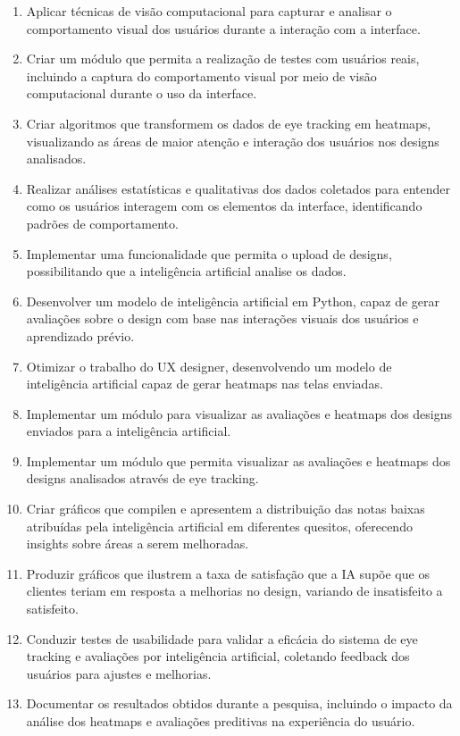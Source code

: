 \begin{enumerate}
    \item Aplicar técnicas de visão computacional para capturar e analisar o comportamento visual dos usuários durante a interação com a interface.
    \item Criar um módulo que permita a realização de testes com usuários reais, incluindo a captura do comportamento visual por meio de visão computacional durante o uso da interface.
    \item Criar algoritmos que transformem os dados de eye tracking em heatmaps, visualizando as áreas de maior atenção e interação dos usuários nos designs analisados.
    \item Realizar análises estatísticas e qualitativas dos dados coletados para entender como os usuários interagem com os elementos da interface, identificando padrões de comportamento.
    \item Implementar uma funcionalidade que permita o upload de designs, possibilitando que a inteligência artificial analise os dados.
    \item Desenvolver um modelo de inteligência artificial em Python, capaz de gerar avaliações sobre o design com base nas interações visuais dos usuários e aprendizado prévio.
    \item Otimizar o trabalho do UX designer, desenvolvendo um modelo de inteligência artificial capaz de gerar heatmaps nas telas enviadas.
    \item Implementar um módulo para visualizar as avaliações e heatmaps dos designs enviados para a inteligência artificial.
    \item Implementar um módulo que permita visualizar as avaliações e heatmaps dos designs analisados através de eye tracking.
    \item Criar gráficos que compilen e apresentem a distribuição das notas baixas atribuídas pela inteligência artificial em diferentes quesitos, oferecendo insights sobre áreas a serem melhoradas.
    \item Produzir gráficos que ilustrem a taxa de satisfação que a IA supõe que os clientes teriam em resposta a melhorias no design, variando de insatisfeito a satisfeito.
    \item Conduzir testes de usabilidade para validar a eficácia do sistema de eye tracking e avaliações por inteligência artificial, coletando feedback dos usuários para ajustes e melhorias.
    \item Documentar os resultados obtidos durante a pesquisa, incluindo o impacto da análise dos heatmaps e avaliações preditivas na experiência do usuário.
\end{enumerate}






